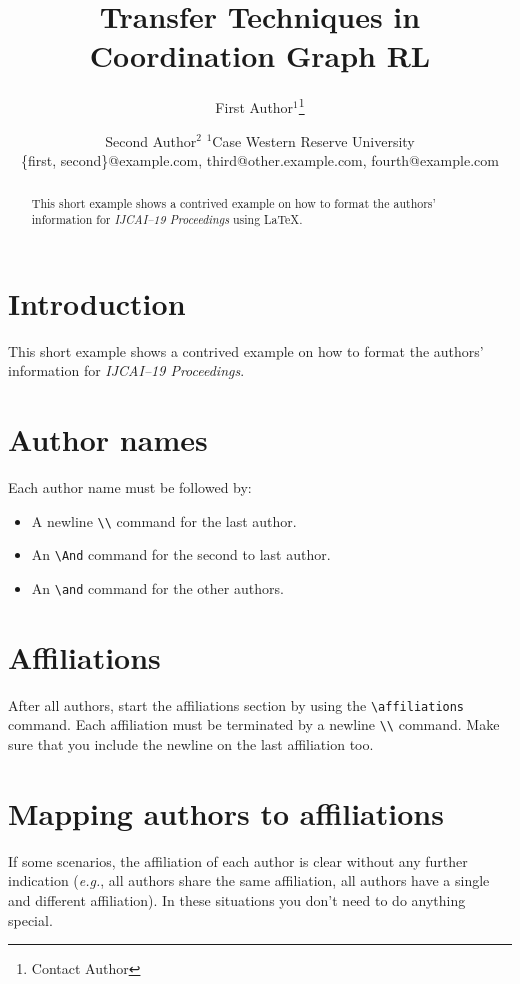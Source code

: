 \documentclass{article}
\title{Transfer Techniques in Coordination Graph RL}
\author{ %
First Author$^1$\footnote{Contact Author}\and
Second Author$^2$   
\affiliations
$^1$Case Western Reserve University\\
\emails  %
\{first, second\}@example.com,
third@other.example.com,
fourth@example.com
}
\begin{document}
\maketitle

\begin{abstract}
This short example shows a contrived example on how to format the authors' information for {\it IJCAI--19 Proceedings} using \LaTeX{}.
\end{abstract}

\section{Introduction}

This short example shows a contrived example on how to format the authors' information for {\it IJCAI--19 Proceedings}.

\section{Author names}

Each author name must be followed by:
\begin{itemize}
    \item A newline {\tt \textbackslash{}\textbackslash{}} command for the last author.
    \item An {\tt \textbackslash{}And} command for the second to last author.
    \item An {\tt \textbackslash{}and} command for the other authors.
\end{itemize}

\section{Affiliations}

After all authors, start the affiliations section by using the {\tt \textbackslash{}affiliations} command.
Each affiliation must be terminated by a newline {\tt \textbackslash{}\textbackslash{}} command. Make sure that you include the newline on the last affiliation too.

\section{Mapping authors to affiliations}

If some scenarios, the affiliation of each author is clear without any further indication (\emph{e.g.}, all authors share the same affiliation, all authors have a single and different affiliation). In these situations you don't need to do anything special.
\end{document}
